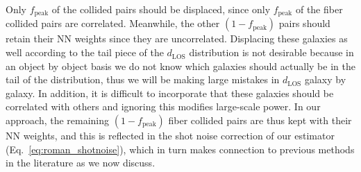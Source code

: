                                                                                                                                                                                                                                                                       Only $f_\mathrm{peak}$ of the 
                                                                                                                                                                                                                                                                      collided pairs should be displaced, since only $f_\mathrm{peak}$ of the fiber 
                                                                                                                                                                                                                                                                      collided pairs are correlated. Meanwhile, the other $(1-f_\mathrm{peak})$ pairs 
                                                                                                                                                                                                                                                                      should retain their NN weights since they are uncorrelated. Displacing these galaxies as well according to the tail piece of the $d_{\mathrm{LOS}}$ distribution is not desirable because  in an object by object basis we do not know which galaxies should actually be in the tail of the distribution, thus we will be making large mistakes in $d_{\mathrm{LOS}}$ galaxy by galaxy. In addition, it is difficult to incorporate that these galaxies should be correlated with others and ignoring this modifies large-scale power. In our approach, the remaining $(1 - f_\mathrm{peak})$ fiber collided pairs are thus kept with their NN weights, and this is reflected in the shot noise correction of our estimator (Eq.~\ref{eq:roman_shotnoise}), which in turn makes connection to previous methods in the literature as we now discuss.


